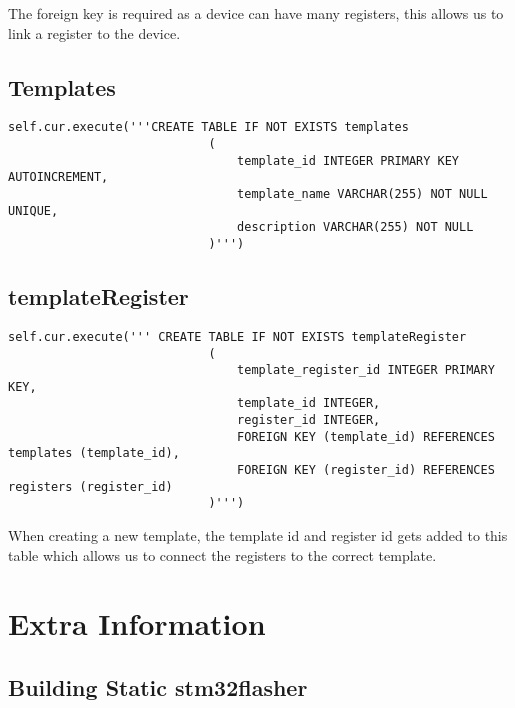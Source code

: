 \documentclass[a4paper,12pt, notitlepage]{article}
\begin{document}
The foreign key is required as a device can have many registers, this allows us to link a register to the device.

\subsection{Templates}

\begin{lstlisting}[caption={The creation of the 'templates' table.},label={lst: dbtmplist}]
self.cur.execute('''CREATE TABLE IF NOT EXISTS templates
                            (
                                template_id INTEGER PRIMARY KEY AUTOINCREMENT,
                                template_name VARCHAR(255) NOT NULL UNIQUE,
                                description VARCHAR(255) NOT NULL
                            )''')
\end{lstlisting}

\subsection{templateRegister}

\begin{lstlisting}[caption={The creation of the 'templates' table.},label={lst: dbtmplist}]
        self.cur.execute(''' CREATE TABLE IF NOT EXISTS templateRegister
                            (
                                template_register_id INTEGER PRIMARY KEY,
                                template_id INTEGER,
                                register_id INTEGER,
                                FOREIGN KEY (template_id) REFERENCES templates (template_id),
                                FOREIGN KEY (register_id) REFERENCES registers (register_id)
                            )''')
\end{lstlisting}

When creating a new template, the template id and register id gets added to this table which allows us to connect the registers to the correct template.

\newpage
\section{Extra Information}
\label{sec: extragui}

\subsection{Building Static stm32flasher}
\end{document}
